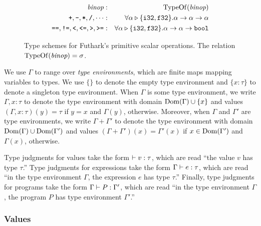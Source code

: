 \documentclass[11pt]{book}
\begin{document}
\begin{figure}
  \begin{eqnarray*}
\mbox{\it{binop}} & : & \mathrm{TypeOf}(\mbox{\it{binop}}) \\
    \texttt{+},\texttt{-},\texttt{*},\texttt{/},\cdots & : & \forall \alpha \triangleright \{\texttt{i32},\texttt{f32}\}. \alpha \rightarrow \alpha \rightarrow \alpha \\
    \texttt{==},\texttt{!=},\texttt{<},\texttt{<=},\texttt{>},\texttt{>=} & : & \forall \alpha \triangleright \{\texttt{i32},\texttt{f32}\}. \alpha \rightarrow \alpha \rightarrow \texttt{bool}
  \end{eqnarray*}
  \caption{Type schemes for Futhark's primitive scalar operations. The relation $\mathrm{TypeOf}(\mbox{\it{binop}}) = \sigma$.}
  \label{fig:primtypeschemes}
\end{figure}


We use $\Gamma$ to range over \emph{type environments}, which are
finite maps mapping variables to types. We use $\{\}$ to denote the
empty type environment and $\{x:\tau\}$ to denote a singleton type
environment. When $\Gamma$ is some type environment, we write
$\Gamma,x:\tau$ to denote the type environment with domain
${\rm Dom}(\Gamma) \cup \{x\}$ and values $(\Gamma,x:\tau)(y) = \tau$ if
$y=x$ and $\Gamma(y)$, otherwise. Moreover, when $\Gamma$ and
$\Gamma'$ are type environments, we write $\Gamma + \Gamma'$ to denote
the type environment with domain ${\rm Dom}(\Gamma) \cup {\rm Dom}(\Gamma')$ and
values $(\Gamma + \Gamma')(x) = \Gamma'(x)$ if $x \in {\rm Dom}(\Gamma')$
and $\Gamma(x)$, otherwise.

Type judgments for values take the form $\vdash v : \tau$, which are read
``the value $v$ has type $\tau$.'' Type judgments for expressions take
the form $\Gamma \vdash e : \tau$, which are read ``in the type
environment $\Gamma$, the expression $e$ has type $\tau$.'' Finally,
type judgments for programs take the form $\Gamma \vdash P : \Gamma'$,
which are read ``in the type environment $\Gamma$, the program $P$ has
type environment $\Gamma'$.''

\subsubsection*{Values }



\end{document}
